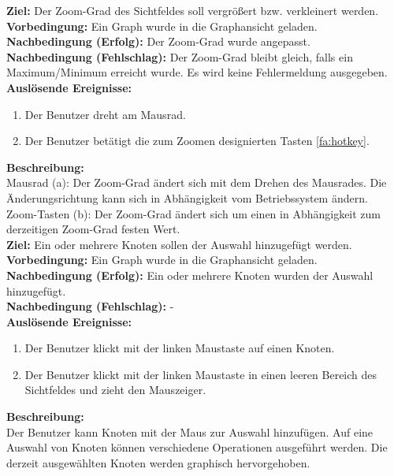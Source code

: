 \label{fa:zoom}
\textbf{Ziel:} Der Zoom-Grad des Sichtfeldes soll vergrößert bzw. verkleinert werden.\\
\textbf{Vorbedingung:} Ein Graph wurde in die Graphansicht geladen.\\
\textbf{Nachbedingung (Erfolg):} Der Zoom-Grad wurde angepasst.\\
\textbf{Nachbedingung (Fehlschlag):} Der Zoom-Grad bleibt gleich, falls ein Maximum/Minimum erreicht wurde. Es wird keine Fehlermeldung ausgegeben.\\
\textbf{Auslösende Ereignisse:}
\begin{enumerate}[nolistsep, label=(\alph*)]
  \item Der Benutzer dreht am Mausrad.
  \item Der Benutzer betätigt die zum Zoomen designierten Tasten \ref{fa:hotkey}.
\end{enumerate}
\textbf{Beschreibung:}\\
Mausrad (a): Der Zoom-Grad ändert sich mit dem Drehen des Mausrades. Die Änderungsrichtung kann sich in Abhängigkeit vom Betriebssystem ändern.\\
Zoom-Tasten (b): Der Zoom-Grad ändert sich um einen in Abhängigkeit zum derzeitigen Zoom-Grad festen Wert.\\

\label{fa:selekt_knoten}
\textbf{Ziel:} Ein oder mehrere Knoten sollen der Auswahl hinzugefügt werden.\\
\textbf{Vorbedingung:} Ein Graph wurde in die Graphansicht geladen.\\
\textbf{Nachbedingung (Erfolg):} Ein oder mehrere Knoten wurden der Auswahl hinzugefügt.\\
\textbf{Nachbedingung (Fehlschlag):} -\\
\textbf{Auslösende Ereignisse:}
\begin{enumerate}[nolistsep, label=(\alph*)]
  \item Der Benutzer klickt mit der linken Maustaste auf einen Knoten.
  \item Der Benutzer klickt mit der linken Maustaste in einen leeren Bereich des Sichtfeldes und zieht den Mauszeiger.
\end{enumerate}
\textbf{Beschreibung:}\\
Der Benutzer kann Knoten mit der Maus zur Auswahl hinzufügen.
Auf eine Auswahl von Knoten können verschiedene Operationen ausgeführt werden. %
Die derzeit ausgewählten Knoten werden graphisch hervorgehoben.\\

